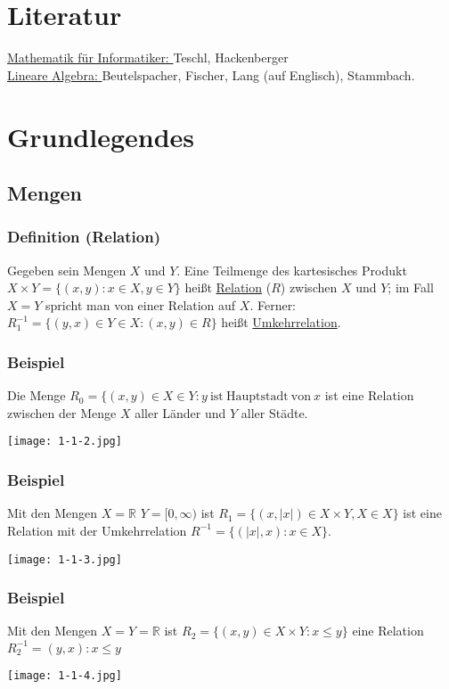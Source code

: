 \hypertarget{contents}{}
\tableofcontents
\pagebreak
{}
\section*{Literatur}
\underline{Mathematik für Informatiker: } Teschl, Hackenberger \\
\underline{Lineare Algebra: } Beutelspacher, Fischer, Lang (auf Englisch), Stammbach.
\section{Grundlegendes}
\subsection{Mengen}
\subsubsection{Definition (Relation)}
Gegeben sein Mengen $X$ und $Y$.  Eine Teilmenge des kartesisches Produkt $X\times Y=\{(x,y):x\in X, y\in Y\}$ heißt \underline{Relation} ($R$) zwischen $X$ und $Y$; im Fall $X=Y$ spricht man von einer Relation auf $X$.  Ferner: $R^{-1}_1=\{(y,x)\in Y \in X: (x,y)\in R\}$ heißt \underline{Umkehrrelation}.
\subsubsection{Beispiel}
Die Menge $R_0=\{(x,y)\in X\in Y: y \mathrm{\ ist\ Hauptstadt\ von\ } x$ ist eine Relation zwischen der Menge $X$ aller Länder und $Y$ aller Städte. \\
\begin{center}
\texttt{[image: 1-1-2.jpg]}
\end{center}
\subsubsection{Beispiel}
Mit den Mengen $X=\mathbb{R}$ $Y=[0,\infty)$ ist $R_1=\{(x,\left| x\right|) \in X\times Y, X\in X\}$ ist eine Relation mit der Umkehrrelation $R^{-1}=\{(\left| x\right|,x):x\in X\}$.\\
\begin{center}
\texttt{[image: 1-1-3.jpg]}
\end{center}
\subsubsection{Beispiel}
Mit den Mengen $X=Y=\mathbb{R}$ ist $R_2=\{(x,y)\in X\times Y:x \leq y\}$
eine Relation $R^{-1}_{2}={(y,x):x\leq y}$ \\
 \begin{center}
\texttt{[image: 1-1-4.jpg]}
\end{center}

